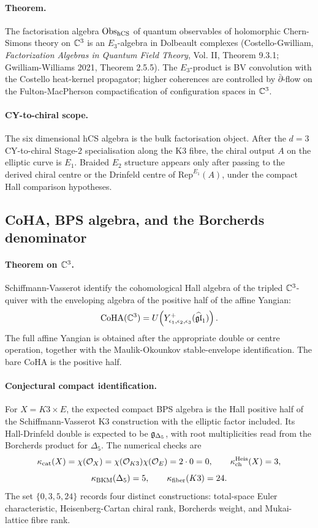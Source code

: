 \paragraph{Theorem.}
The factorisation algebra \(\mathrm{Obs}_{\mathrm{hCS}}\) of quantum observables of
holomorphic Chern-Simons theory on \(\mathbb{C}^3\) is an \(E_3\)-algebra in
Dolbeault complexes (Costello-Gwilliam, \emph{Factorization Algebras
in Quantum Field Theory}, Vol. II, Theorem 9.3.1; Gwilliam-Williams
2021, Theorem 2.5.5).  The \(E_3\)-product is BV convolution with the
Costello heat-kernel propagator; higher coherences are controlled by
\(\bar\partial\)-flow on the Fulton-MacPherson compactification of
configuration spaces in \(\mathbb{C}^3\).

\paragraph{CY-to-chiral scope.}
The six dimensional hCS algebra is the bulk factorisation object.  After
the \(d=3\) CY-to-chiral Stage-2 specialisation along the K3 fibre, the
chiral output \(A\) on the elliptic curve is \(E_1\).  Braided \(E_2\)
structure appears only after passing to the derived chiral centre or
the Drinfeld centre of \(\mathrm{Rep}^{E_1}(A)\), under the compact Hall
comparison hypotheses.

\subsection*{CoHA, BPS algebra, and the Borcherds denominator}

\paragraph{Theorem on \(\mathbb{C}^3\).}
Schiffmann-Vasserot identify the cohomological Hall algebra of the
tripled \(\mathbb{C}^3\)-quiver with the enveloping algebra of the positive
half of the affine Yangian:
\[
  \mathrm{CoHA}(\mathbb{C}^3)=
  U\!\left(Y^+_{\epsilon_1,\epsilon_2,\epsilon_3}(\widehat{\mathfrak{gl}}_1)\right).
\]
The full affine Yangian is obtained after the appropriate double or
centre operation, together with the Maulik-Okounkov stable-envelope
identification.  The bare CoHA is the positive half.

\paragraph{Conjectural compact identification.}
For \(X=K3\times E\), the expected compact BPS algebra is the Hall
positive half of the Schiffmann-Vasserot K3 construction with the
elliptic factor included.  Its Hall-Drinfeld double is expected to be
\(\mathfrak{g}_{\Delta_5}\), with root multiplicities read from the Borcherds product
for \(\Delta_5\).  The numerical checks are
\[
  \kappa_{\mathrm{cat}}(X)=\chi(\mathcal{O}_X)=\chi(\mathcal{O}_{K3})\chi(\mathcal{O}_E)=2\cdot0=0,
  \qquad
  \kappa_{\mathrm{ch}}^{\mathrm{Heis}}(X)=3,
\]
\[
  \kappa_{\mathrm{BKM}}(\Delta_5)=5,
  \qquad
  \kappa_{\mathrm{fiber}}(K3)=24.
\]
The set \(\{0,3,5,24\}\) records four distinct constructions:
total-space Euler characteristic, Heisenberg-Cartan chiral rank,
Borcherds weight, and Mukai-lattice fibre rank.

